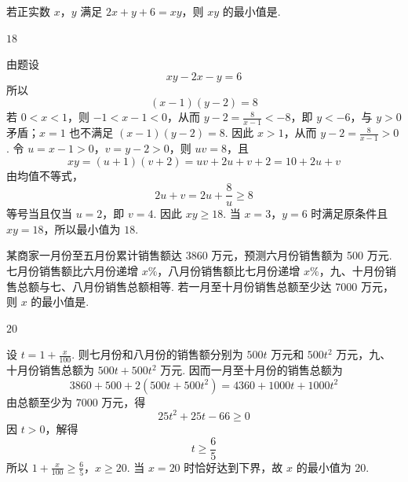 \begin{problem}
若正实数 \(x\)，\(y\) 满足 \(2x + y + 6 = xy\)，则 \(xy\) 的最小值是\fillinblank{}.

\begin{answer}
\(18\)
\end{answer}

\begin{solution}
由题设
\[
xy-2x-y=6
\]
所以
\[
(x-1)(y-2)=8
\]
若 \(0<x<1\)，则 \(-1<x-1<0\)，从而
\(y-2=\frac{8}{x-1}<-8\)，即 \(y<-6\)，与 \(y>0\) 矛盾；\(x=1\) 也不满足
\((x-1)(y-2)=8\). 因此 \(x>1\)，从而 \(y-2=\frac{8}{x-1}>0\). 令
\(u=x-1>0\)，\(v=y-2>0\)，则 \(uv=8\)，且
\[
xy=(u+1)(v+2)=uv+2u+v+2=10+2u+v
\]
由均值不等式，
\[
2u+v=2u+\frac{8}{u}\geqslant8
\]
等号当且仅当 \(u=2\)，即 \(v=4\). 因此
\(xy\geqslant18\). 当 \(x=3\)，\(y=6\) 时满足原条件且 \(xy=18\)，所以最小值为 \(18\).
\end{solution}
\end{problem}

\begin{problem}
某商家一月份至五月份累计销售额达 3860 万元，预测六月份销售额为 500 万元. 七月份销售额比六月份递增 \(x\%\)，八月份销售额比七月份递增 \(x\%\)，九、十月份销售总额与七、八月份销售总额相等. 若一月至十月份销售总额至少达 7000 万元，则 \(x\) 的最小值是\fillinblank{}.

\begin{answer}
\(20\)
\end{answer}

\begin{solution}
设 \(t=1+\frac{x}{100}\). 则七月份和八月份的销售额分别为
\(500t\) 万元和 \(500t^2\) 万元，九、十月份销售总额为
\(500t+500t^2\) 万元. 因而一月至十月份的销售总额为
\[
3860+500+2(500t+500t^2)=4360+1000t+1000t^2
\]
由总额至少为 \(7000\) 万元，得
\[
25t^2+25t-66\geqslant0
\]
因 \(t>0\)，解得
\[
t\geqslant\frac65
\]
所以
\(1+\frac{x}{100}\geqslant\frac65\)，\(x\geqslant20\).
当 \(x=20\) 时恰好达到下界，故 \(x\) 的最小值为 \(20\).
\end{solution}
\end{problem}

